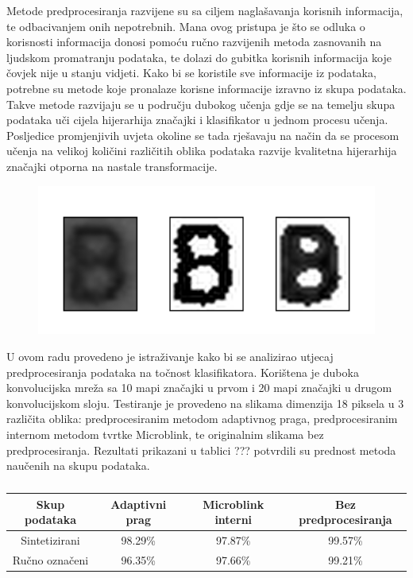 \documentclass[lmodern, utf8, diplomski, numeric]{fer}
\begin{document}
Metode predprocesiranja razvijene su sa ciljem naglašavanja korisnih informacija, te odbacivanjem onih nepotrebnih. Mana ovog pristupa je što se odluka o korisnosti informacija donosi pomoću ručno razvijenih metoda zasnovanih na ljudskom promatranju podataka, te dolazi do gubitka korisnih informacija koje čovjek nije u stanju vidjeti. Kako bi se koristile sve informacije iz podataka, potrebne su metode koje pronalaze korisne informacije izravno iz skupa podataka. Takve metode razvijaju se u području dubokog učenja gdje se na temelju skupa podataka uči cijela hijerarhija značajki i klasifikator u jednom procesu učenja. Posljedice promjenjivih uvjeta okoline se tada rješavaju na način da se procesom učenja na velikoj količini različitih oblika podataka razvije kvalitetna hijerarhija značajki otporna na nastale transformacije.

\begin{figure}[ht!]
\centering
\includegraphics[width=13cm]{slike/preprocessing_comparison.png}
\caption{}
\end{figure}

U ovom radu provedeno je istraživanje kako bi se analizirao utjecaj predprocesiranja podataka na točnost klasifikatora. Korištena je duboka konvolucijska mreža sa 10 mapi značajki u prvom i 20 mapi značajki u drugom konvolucijskom sloju. Testiranje je provedeno na slikama dimenzija 18 piksela u 3 različita oblika: predprocesiranim metodom adaptivnog praga, predprocesiranim internom metodom tvrtke Microblink, te originalnim slikama bez predprocesiranja. Rezultati prikazani u tablici ??? potvrdili su prednost metoda naučenih na skupu podataka.    

\begin{table}[ht!]
\begin{center}
\centering
    \begin{tabular}{ | c| c| c|c |}
    \hline
    Skup podataka & Adaptivni prag & Microblink interni & Bez predprocesiranja \\ \hline
    Sintetizirani & 98.29\% & 97.87\%  & 99.57\% \\ \hline
    Ručno označeni & 96.35\% & 97.66\% & 99.21\% \\  
    \hline
    \end{tabular}
\end{center}
\caption{}
\end{table}
\end{document}
